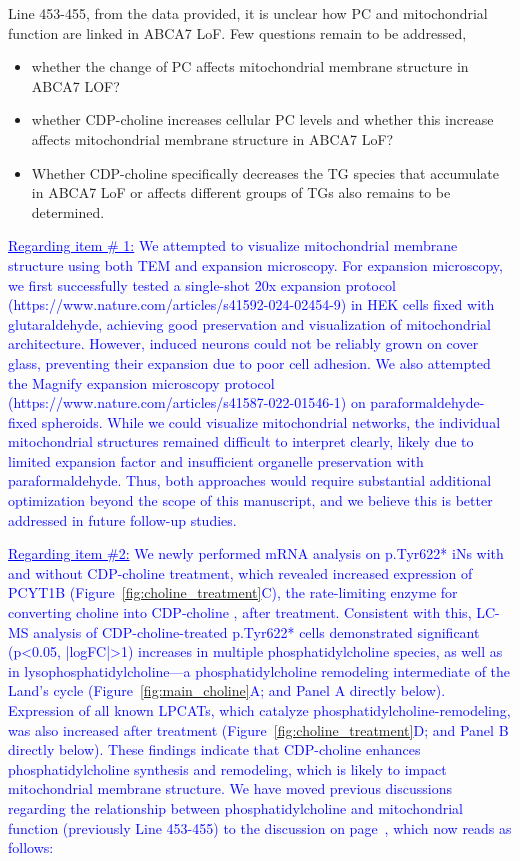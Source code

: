 \documentclass[12pt]{article}
\begin{document}
Line 453-455, from the data provided, it is unclear how PC and mitochondrial function are linked in ABCA7 LoF. Few questions remain to be addressed,
\begin{itemize}
	\item whether the change of PC affects mitochondrial membrane structure in ABCA7 LOF?

	\item whether CDP-choline increases cellular PC levels and whether this increase affects mitochondrial membrane structure in ABCA7 LoF?
	
	\item Whether CDP-choline specifically decreases the TG species that accumulate in ABCA7 LoF or affects different groups of TGs also remains to be determined.
\end{itemize}

\textcolor{blue}{\underline{Regarding item \# 1:} We attempted to visualize mitochondrial membrane structure using both TEM and expansion microscopy. For expansion microscopy, we first successfully tested a single-shot 20x expansion protocol (https://www.nature.com/articles/s41592-024-02454-9) in HEK cells fixed with glutaraldehyde, achieving good preservation and visualization of mitochondrial architecture. However, induced neurons could not be reliably grown on cover glass, preventing their expansion due to poor cell adhesion. We also attempted the Magnify expansion microscopy protocol (https://www.nature.com/articles/s41587-022-01546-1) on paraformaldehyde-fixed spheroids. While we could visualize mitochondrial networks, the individual mitochondrial structures remained difficult to interpret clearly, likely due to limited expansion factor and insufficient organelle preservation with paraformaldehyde. Thus, both approaches would require substantial additional optimization beyond the scope of this manuscript, and we believe this is better addressed in future follow-up studies.}

\textcolor{blue}{\underline{Regarding item \#2:} We newly performed mRNA analysis on p.Tyr622* iNs with and without CDP-choline treatment, which revealed increased expression of PCYT1B (Figure~\ref{fig:choline_treatment}C), the rate-limiting enzyme for converting choline into CDP-choline \cite{Lykidis1998-rj}, after treatment. Consistent with this, LC-MS analysis of CDP-choline-treated p.Tyr622* cells demonstrated significant (p<0.05, |logFC|>1) increases in multiple phosphatidylcholine species, as well as in lysophosphatidylcholine—a phosphatidylcholine remodeling intermediate of the Land’s cycle (Figure~\ref{fig:main_choline}A; and Panel A directly below). Expression of all known LPCATs, which catalyze phosphatidylcholine-remodeling, was also increased  after treatment (Figure~\ref{fig:choline_treatment}D; and Panel B directly below). These findings indicate that CDP-choline enhances phosphatidylcholine synthesis and remodeling, which is likely to impact mitochondrial membrane structure. We have moved previous discussions regarding the relationship between phosphatidylcholine and mitochondrial function (previously Line 453-455) to the discussion on page~\pageref{quoteI-label}, which now reads as follows:}
\end{document}
